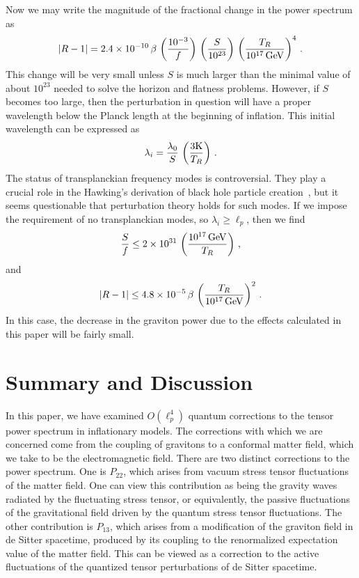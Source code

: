 \documentclass[preprint,prd,showpacs,superscriptaddress]{revtex4}
\begin{document}
Now we may write the magnitude of the fractional change in the power spectrum as
\begin{equation}
|R-1| = 2.4 \times 10^{-10}\, \beta\, \left(\frac{10^{-3}}{f}\right) \, \left(\frac{S}{10^{23}}\right) \, 
\left(\frac{T_R}{10^{17}\, {\rm GeV}} \right)^4 \,.
\end{equation}
This change will be very small unless $S$ is much larger than the minimal value of about $10^{23}$ needed to solve the 
horizon and flatness problems. However, if $S$ becomes too large, then the perturbation in question will have a proper
wavelength below the Planck length at the beginning of inflation. This initial wavelength can be expressed as
\begin{equation}
\lambda_i = \frac{\lambda_0}{S}\, \left(\frac{3 {\rm K}}{T_R} \right)\,.
\end{equation}
The status of transplanckian frequency modes is controversial. They play a crucial role in the Hawking's derivation
of black hole particle creation~\cite{Hawking}, but it seems questionable that perturbation theory holds for such modes. 
If we impose the requirement of no transplanckian modes, so $\lambda_i \geq \ell_p$, then we find
\begin{equation}
\frac{S}{f} \leq 2 \times 10^{31}\,  \left( \frac{10^{17}\, {\rm GeV}}{T_R} \right) \,,
\end{equation}
and
\begin{equation}
|R-1| \leq 4.8 \times10^{-5}\, \beta \, \left(\frac{T_R}{10^{17}\, {\rm GeV}} \right)^2\,.
\end{equation}
In this case, the decrease in the graviton power due to the effects calculated in this paper will be fairly small.


\section{Summary and Discussion}
\label{S:sum}

In this paper, we have examined $O(\ell_p^4)$ quantum corrections to the tensor power spectrum in inflationary models.
The corrections with which we are concerned come from the coupling of gravitons to a conformal matter field, which we take
to be the electromagnetic field. There are two distinct corrections to the power spectrum. One is $P_{22}$, which arises
from vacuum stress tensor fluctuations of the matter field. One can view this contribution as being the gravity waves
radiated by the fluctuating stress tensor, or equivalently, the passive fluctuations of the gravitational field driven by the
quantum stress tensor fluctuations. The other contribution is  $P_{13}$, which arises from a modification of the graviton
field in de Sitter spacetime, produced by its coupling to the renormalized expectation value of the matter field. This can 
be viewed as a correction to the active fluctuations of the quantized tensor perturbations of  de Sitter spacetime.
\end{document}
